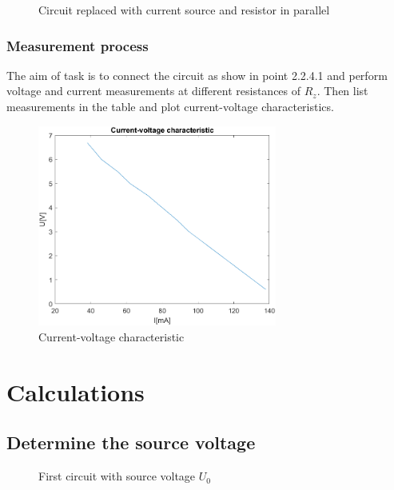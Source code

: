 \documentclass[]{scrartcl}
\begin{document}
\begin{figure}[H]
	\centering
	
	\caption{Circuit replaced with current source and resistor in parallel}
	\label{fig:nortion-replaced}
\end{figure}

\subsubsection{Measurement process}

The aim of task is to connect the circuit as show in point 2.2.4.1 and perform voltage and current measurements at different resistances of $R_z$. Then list measurements in the table and plot current-voltage characteristics.



\begin{figure}[H]
	\centering
	\includegraphics[width=0.7\textwidth]{Pictures/ct_cv_char_2.png}
	\caption{Current-voltage characteristic}
	\label{fig:current-voltage char}
\end{figure}

\section{Calculations}

\subsection{Determine the source voltage}

\begin{figure}[H]
	\centering
	
	\caption{First circuit with source voltage $U_0$}
	\label{fig:first_circuit_volatage_U0}
\end{figure}
\end{document}
